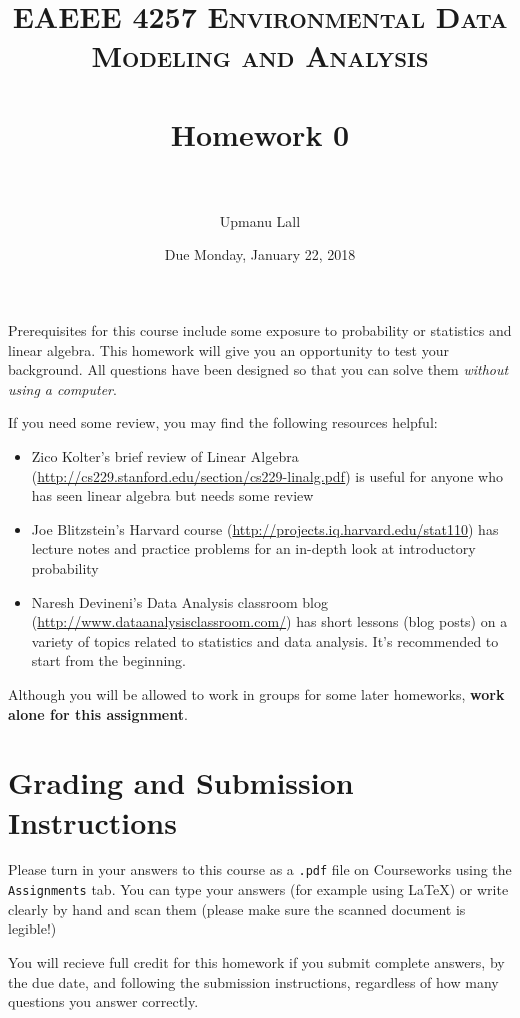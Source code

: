\documentclass[paper=letter, fontsize=11pt]{scrartcl}
\title{
\normalfont \normalsize
\textsc{EAEEE 4257 Environmental Data Modeling and Analysis} \\ [25pt] %
\horrule{0.5pt} \\[0.4cm] %
\huge Homework 0 \\ %
\horrule{2pt} \\[0.5cm] %
}
\author{Upmanu Lall} %
\date{\normalsize Due Monday, January 22, 2018} %
\numberwithin{equation}{section}
\numberwithin{figure}{section}
\numberwithin{table}{section}
\begin{document}
\maketitle %


Prerequisites for this course include some exposure to probability or statistics and linear algebra.
This homework will give you an opportunity to test your background.
All questions have been designed so that you can solve them \emph{without using a computer}.

If you need some review, you may find the following resources helpful:
\begin{itemize}
  \item Zico Kolter's brief review of Linear Algebra (\url{http://cs229.stanford.edu/section/cs229-linalg.pdf}) is useful for anyone who has seen linear algebra but needs some review
  \item Joe Blitzstein's Harvard course (\url{http://projects.iq.harvard.edu/stat110}) has lecture notes and practice problems for an in-depth look at introductory probability
  \item Naresh Devineni's Data Analysis classroom blog (\url{http://www.dataanalysisclassroom.com/}) has short lessons (blog posts) on a variety of topics related to statistics and data analysis. It's recommended to start from the beginning.
\end{itemize}

Although you will be allowed to work in groups for some later homeworks, \textbf{work alone for this assignment}.

\section*{Grading and Submission Instructions}

Please turn in your answers to this course as a \texttt{.pdf} file on Courseworks using the \texttt{Assignments} tab.
You can type your answers (for example using \LaTeX) or write clearly by hand and scan them (please make sure the scanned document is legible!)

You will recieve full credit for this homework if you submit complete answers, by the due date, and following the submission instructions, regardless of how many questions you answer correctly.
\end{document}
